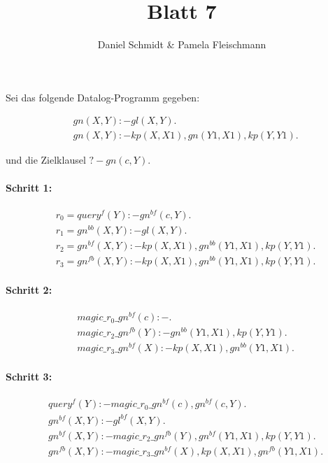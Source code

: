 \documentclass[12pt,a4paper]{amsart}
\begin{document}
\title{Blatt 7}

\author{Daniel Schmidt \& Pamela Fleischmann}

\maketitle

\begin{aufgabe1}
Sei das folgende Datalog-Programm gegeben:

\begin{align*}
&gn(X,Y) :- gl(X,Y). \\
&gn(X,Y) :- kp(X,X1), gn(Y1,X1), kp(Y,Y1).
\end{align*}

und die Zielklausel $? - gn(c,Y).$

\paragraph{Schritt 1:}
\begin{align*}
&r_0 = query^{f}(Y) :- gn^{bf}(c,Y). \\
&r_1 = gn^{bb}(X,Y) :- gl(X,Y). \\
&r_2 = gn^{bf}(X,Y) :- kp(X,X1), gn^{bb}(Y1,X1), kp(Y,Y1). \\
&r_3 = gn^{fb}(X,Y) :- kp(X,X1), gn^{bb}(Y1,X1), kp(Y,Y1).
\end{align*}

\paragraph{Schritt 2:}

\begin{align*}
&magic\_r_0\_gn^{bf}(c) :- . \\
&magic\_r_2\_gn^{fb}(Y) :- gn^{bb}(Y1,X1), kp(Y,Y1). \\
&magic\_r_3\_gn^{bf}(X) :- kp(X,X1), gn^{bb}(Y1,X1).
\end{align*}

\paragraph{Schritt 3:}

\begin{align*}
&query^{f}(Y) :- magic\_r_0\_gn^{bf}(c), gn^{bf}(c,Y). \\
&gn^{bf}(X,Y) :- gl^{bf}(X,Y). \\
&gn^{bf}(X,Y) :- magic\_r_2\_gn^{fb}(Y), gn^{bf}(Y1,X1), kp(Y,Y1). \\
&gn^{fb}(X,Y) :- magic\_r_3\_gn^{bf}(X), kp(X,X1), gn^{fb}(Y1,X1).
\end{align*}


\end{aufgabe1}
\end{document}
